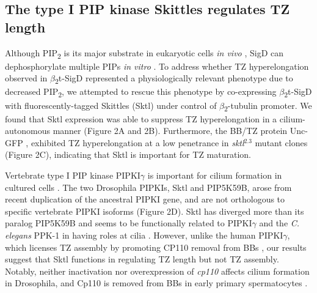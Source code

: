 \documentclass[12pt, twoside, letterpaper]{article}
\newcommand{\PIP}{PIP\textsubscript{2}}
\newcommand{\sigd}{$\beta$\textsubscript{2}t-SigD}
\begin{document}
\begin{doublespacing}
\begin{linenumbers}
    \subsection*{The type I PIP kinase Skittles regulates TZ length}
    Although \PIP{} is its major substrate in eukaryotic cells \textit{in vivo}
    \citep{terebiznik2002elimination, zhou2001salmonella, sengupta2013depletion},
    SigD can dephosphorylate multiple PIPs \textit{in vitro}
    \citep{norris1998sopb}.
    To address whether TZ hyperelongation observed in \sigd{} represented a
    physiologically relevant phenotype due to decreased \PIP{},
    we attempted to rescue this phenotype by
    co-expressing \sigd{} with
    fluorescently-tagged Skittles (Sktl)
    under control of $\beta$\textsubscript{2}-tubulin promoter.
    We found that Sktl expression was able to suppress TZ hyperelongation
    in a cilium-autonomous manner (Figure 2A and 2B).
    Furthermore, the BB/TZ protein Unc-GFP
    \citep{baker2004mechanosensory, wei2008depletion},
    exhibited TZ hyperelongation at a low penetrance in \textit{sktl}$^{2.3}$
    mutant clones (Figure 2C),
    indicating that Sktl is important for TZ maturation.

    Vertebrate type I PIP kinase PIPKI$\gamma$ is important for cilium formation in cultured cells
    \citep{xu2016phosphatidylinositol}.
    The two Drosophila PIPKIs, Sktl and PIP5K59B,
    arose from recent duplication of
    the ancestral PIPKI gene,
    and are not orthologous to specific vertebrate PIPKI isoforms (Figure 2D).
    Sktl has diverged more than its paralog PIP5K59B and seems
    to be functionally related to PIPKI$\gamma$
    and the \textit{C. elegans} PPK-1 in having roles at cilia \citep{xu2014pipkigamma}.
    However, unlike the human PIPKI$\gamma$, which licenses TZ assembly
    by promoting CP110 removal from BBs \citep{xu2016phosphatidylinositol},
    our results suggest that Sktl functions in
    regulating TZ length but not TZ assembly. 
    Notably, neither inactivation nor overexpression of \textit{cp110} affects
    cilium formation in Drosophila, and Cp110
    is removed from BBs in early primary spermatocytes
    \citep{franz2013cp110}.
    

\end{linenumbers}
\end{doublespacing}
\end{document}
